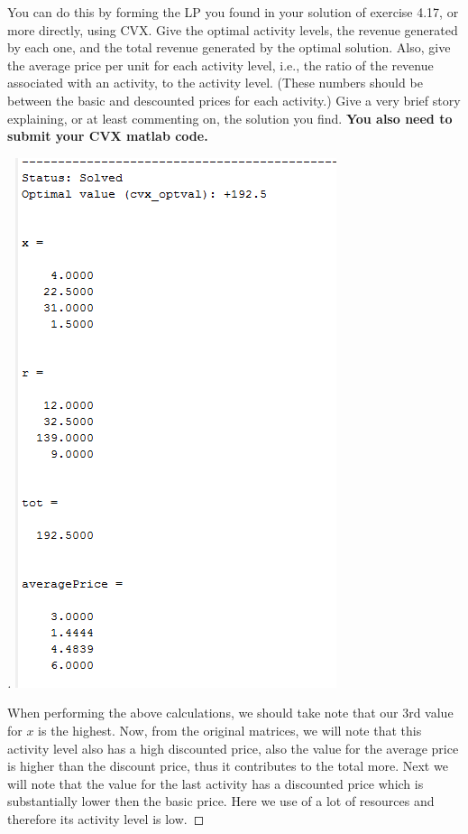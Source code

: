 You can do this by forming the LP you found in your solution of exercise 4.17, or more directly,
using CVX. Give the optimal activity levels, the revenue generated by each one, and the total
revenue generated by the optimal solution. Also, give the average price per unit for each activity
level, i.e., the ratio of the revenue associated with an activity, to the activity level. (These
numbers should be between the basic and descounted prices for each activity.) Give a very brief
story explaining, or at least commenting on, the solution you find. \textbf{You also need to
  submit your CVX matlab code.}
\begin{proof}[\sol]
  
  \includegraphics{source/h3qq2}

  When performing the above calculations, we should take note that our 3rd value for $x$ is the highest. Now, from the original matrices, we will note that this activity level also has a high discounted price, also the value for the average price is higher than the discount price, thus it contributes to the total more.  Next we will note that the value for the last activity has a discounted price which is substantially lower then the basic price. Here we use of a lot of resources and therefore its activity level is low.
\end{proof}

